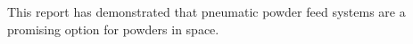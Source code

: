 This report has demonstrated that pneumatic powder feed systems are a promising option for powders in space.
